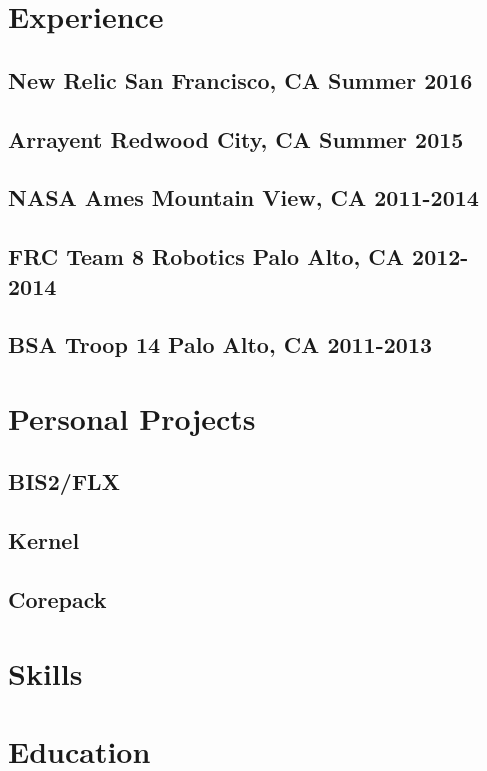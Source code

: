 \documentclass[letterpaper]{article}
\newcommand{\subtitle}{\normalfont\sffamily\color{black}\footnotesize}
\begin{document}
\sffamily
\section*{Experience}
\subsection*{New Relic \subtitle San Francisco, CA Summer 2016}

\subsection*{Arrayent \subtitle Redwood City, CA Summer 2015}

\subsection*{NASA Ames \subtitle Mountain View, CA 2011-2014}

\subsection*{FRC Team 8 Robotics \subtitle Palo Alto, CA 2012-2014}

\subsection*{BSA Troop 14 \subtitle Palo Alto, CA 2011-2013}

\section*{Personal Projects}

\subsection*{BIS2/FLX}

\subsection*{Kernel}

\subsection*{Corepack}

\section*{Skills}

\section*{Education}
\end{document}
